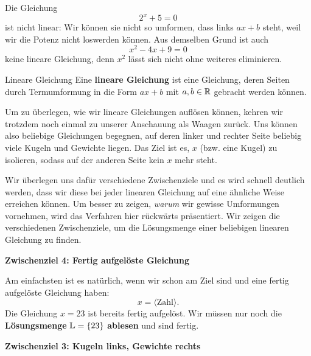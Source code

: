 \documentclass[../../main.tex]{subfiles}
\begin{document}
\begin{example}{}
    Die Gleichung 
    \[2^x+5=0\] 
    ist nicht linear: Wir können sie nicht so umformen, dass links $ax+b$ steht, weil wir die Potenz nicht loswerden können. Aus demselben Grund ist auch 
    \[x^2-4x+9=0\] 
    keine lineare Gleichung, denn $x^2$ lässt sich nicht ohne weiteres eliminieren.
\end{example}

\begin{definition}{Lineare Gleichung}
    Eine \textbf{lineare Gleichung} ist eine Gleichung, deren Seiten durch Termumformung in die Form $ax+b$ mit $a,b\in\mathbb{R}$ gebracht werden können.
\end{definition}

Um zu überlegen, wie wir lineare Gleichungen auflösen können, kehren wir trotzdem noch einmal zu unserer Anschauung als Waagen zurück. Uns können also beliebige Gleichungen begegnen, auf deren linker und rechter Seite beliebig viele Kugeln und Gewichte liegen. Das Ziel ist es, $x$ (bzw. eine Kugel) zu isolieren, sodass auf der anderen Seite kein $x$ mehr steht.

Wir überlegen uns dafür verschiedene Zwischenziele und es wird schnell deutlich werden, dass wir diese bei jeder linearen Gleichung auf eine ähnliche Weise erreichen können. Um besser zu zeigen, \emph{warum} wir gewisse Umformungen vornehmen, wird das Verfahren hier rückwärts präsentiert. Wir zeigen die verschiedenen Zwischenziele, um die Lösungsmenge einer beliebigen linearen Gleichung zu finden.

\textbf{Zwischenziel 4: Fertig aufgelöste Gleichung}

Am einfachsten ist es natürlich, wenn wir schon am Ziel sind und eine fertig aufgelöste Gleichung haben: 
\[x=\langle \text{Zahl} \rangle.\]
Die Gleichung $x=23$ ist bereits fertig aufgelöst. Wir müssen nur noch die \textbf{Lösungsmenge} $\mathbb{L}=\{23\}$ \textbf{ablesen} und sind fertig.

\textbf{Zwischenziel 3: Kugeln links, Gewichte rechts}
\end{document}
